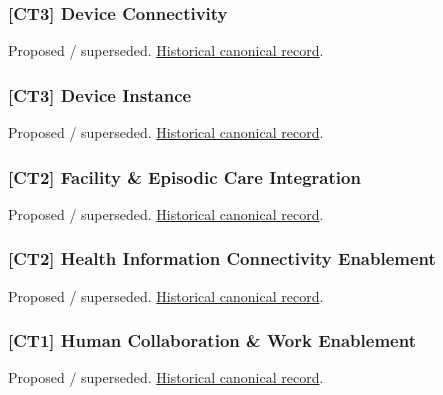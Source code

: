 \subsubsection{[CT3] Device Connectivity}

\par\label{element:658d4b6770a943bcb5801fb7ca9b47be}
Proposed / superseded. \href{../../../../continuum/strategy/capability/658d4b6770a943bcb5801fb7ca9b47be.md}{Historical canonical record}.\par

\subsubsection{[CT3] Device Instance}

\par\label{element:dd860926038f41e082c56e38cbb5ab95}
Proposed / superseded. \href{../../../../continuum/strategy/capability/dd860926038f41e082c56e38cbb5ab95.md}{Historical canonical record}.\par

\subsubsection{[CT2] Facility \& Episodic Care Integration}

\par\label{element:c1eb24ed7e36417cb426288ff57512c0}
Proposed / superseded. \href{../../../../continuum/strategy/capability/c1eb24ed7e36417cb426288ff57512c0.md}{Historical canonical record}.\par

\subsubsection{[CT2] Health Information Connectivity Enablement}

\par\label{element:6a1030483dfc4ae6af6998b587129d1c}
Proposed / superseded. \href{../../../../continuum/strategy/capability/6a1030483dfc4ae6af6998b587129d1c.md}{Historical canonical record}.\par

\subsubsection{[CT1] Human Collaboration \& Work Enablement}

\par\label{element:c9347f73b21242c5b8cce41252b74da0}
Proposed / superseded. \href{../../../../continuum/strategy/capability/c9347f73b21242c5b8cce41252b74da0.md}{Historical canonical record}.\par

